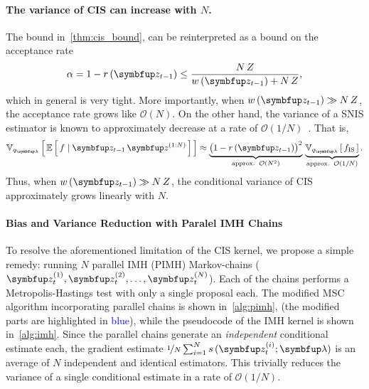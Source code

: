 \vspace{-0.1in}
\paragraph{The variance of CIS can increase with \(N\).}
The bound in~\cref{thm:cis_bound}, can be reinterpreted as a bound on the acceptance rate 
\begin{align}
  \alpha = 1 - r\,(\vz_{t-1}) \leq \frac{N\,Z}{ w\,(\vz_{t-1}) + N\,Z},
\end{align}
which in general is very tight.
More importantly, when \(w\,(\vz_{t-1}) \gg N\,Z\), the acceptance rate grows like \(\mathcal{O}(N)\).
On the other hand, the variance of a SNIS estimator is known to approximately decrease at a rate of \(\mathcal{O}(1/N)\)~\citep{kong_sequential_1994, robert_monte_2004, elvira_rethinking_2018}.
That is, 
\begin{align}
  \Vsub{q_{\vlambda}}{ \E{ f \mid \vz_{t-1}\,\vz^{(1:N)} } } \approx \underbrace{{\big(1 - r\,(\vz_{t-1})\big)}^2}_{\text{approx.}\;\;\mathcal{O}(N^2)} \,
  \underbrace{\Vsub{q_{\vlambda}}{ f_{\text{IS}} }}_{\text{approx.}\;\;\mathcal{O}(1/N)}.\label{eq:cis_variance_incr}
\end{align}
Thus, when \(w\,(\vz_{t-1})\gg N\,Z\), the conditional variance of CIS approximately grows linearly with \(N\).

\vspace{-0.1in}
\paragraph{Bias and Variance Reduction with Paralel IMH Chains}
To resolve the aforementioned limitation of the CIS kernel, we propose a simple remedy: running \(N\) parallel IMH (PIMH) Markov-chains (\(\vz_t^{(1)}, \vz_t^{(2)}, \ldots, \vz_t^{(N)}\)).
Each of the chains performs a Metropolis-Hastings test with only a single proposal each.
The modified MSC algorithm incorporating parallel chains is shown in~\cref{alg:pimh}, (the modified parts are highlighted in \textcolor{blue}{blue}), while the pseudocode of the IMH kernel is shown in~\cref{alg:imh}.
Since the parallel chains generate an \textit{independent} conditional estimate each, the gradient estimate \(\nicefrac{1}{N} \sum^{N}_{i=1} s\,(\vz_t^{(i)}; \vlambda)\) is an average of \(N\) independent and identical estimators.
This trivially reduces the variance of a single conditional estimate in a rate of \(\mathcal{O}(1/N)\).
%
%

